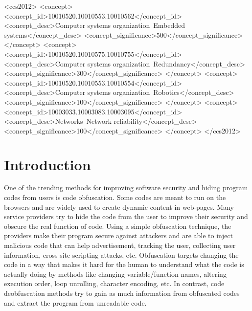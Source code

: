 \documentclass[acmsmall]{acmart}
\begin{document}
\begin{CCSXML}
<ccs2012>
 <concept>
  <concept_id>10010520.10010553.10010562</concept_id>
  <concept_desc>Computer systems organization~Embedded systems</concept_desc>
  <concept_significance>500</concept_significance>
 </concept>
 <concept>
  <concept_id>10010520.10010575.10010755</concept_id>
  <concept_desc>Computer systems organization~Redundancy</concept_desc>
  <concept_significance>300</concept_significance>
 </concept>
 <concept>
  <concept_id>10010520.10010553.10010554</concept_id>
  <concept_desc>Computer systems organization~Robotics</concept_desc>
  <concept_significance>100</concept_significance>
 </concept>
 <concept>
  <concept_id>10003033.10003083.10003095</concept_id>
  <concept_desc>Networks~Network reliability</concept_desc>
  <concept_significance>100</concept_significance>
 </concept>
</ccs2012>
\end{CCSXML}




\maketitle

\section{Introduction}
One of the trending methods for improving software security and hiding program codes from users is code obfuscation. Some codes are meant to run on the browsers and are widely used to create dynamic content in web-pages. Many service providers try to hide the code from the user to improve their security and obscure the real function of code. Using a simple obfuscation technique, the providers make their program secure against attackers and are able to inject malicious code that can help advertisement, tracking the user, collecting user information, cross-site scripting attacks, etc. Obfuscation targets changing the code in a way that makes it hard for the human to understand what the code is actually doing by methods like changing variable/function names, altering execution order, loop unrolling, character encoding, etc. In contrast, code deobfuscation methods try to gain as much information from obfuscated codes and extract the program from unreadable code.
\end{document}
